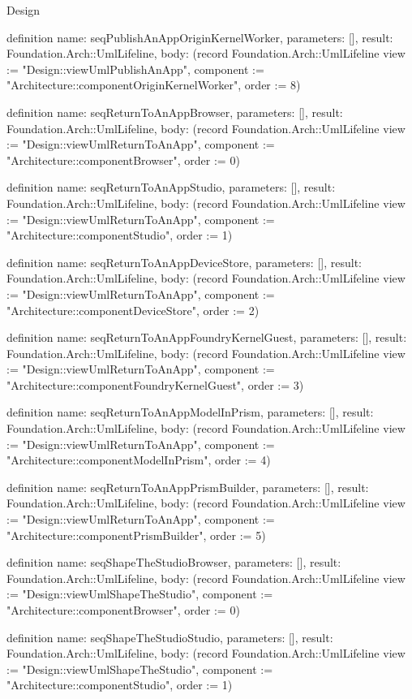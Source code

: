 \begin{lexlean}{Design}
\begin{semanticmodule}
definition{
  name: seqPublishAnAppOriginKernelWorker,
  parameters: [],
  result: Foundation.Arch::UmlLifeline,
  body: (record Foundation.Arch::UmlLifeline {view := "Design::viewUmlPublishAnApp", component := "Architecture::componentOriginKernelWorker", order := 8})
}

definition{
  name: seqReturnToAnAppBrowser,
  parameters: [],
  result: Foundation.Arch::UmlLifeline,
  body: (record Foundation.Arch::UmlLifeline {view := "Design::viewUmlReturnToAnApp", component := "Architecture::componentBrowser", order := 0})
}

definition{
  name: seqReturnToAnAppStudio,
  parameters: [],
  result: Foundation.Arch::UmlLifeline,
  body: (record Foundation.Arch::UmlLifeline {view := "Design::viewUmlReturnToAnApp", component := "Architecture::componentStudio", order := 1})
}

definition{
  name: seqReturnToAnAppDeviceStore,
  parameters: [],
  result: Foundation.Arch::UmlLifeline,
  body: (record Foundation.Arch::UmlLifeline {view := "Design::viewUmlReturnToAnApp", component := "Architecture::componentDeviceStore", order := 2})
}

definition{
  name: seqReturnToAnAppFoundryKernelGuest,
  parameters: [],
  result: Foundation.Arch::UmlLifeline,
  body: (record Foundation.Arch::UmlLifeline {view := "Design::viewUmlReturnToAnApp", component := "Architecture::componentFoundryKernelGuest", order := 3})
}

definition{
  name: seqReturnToAnAppModelInPrism,
  parameters: [],
  result: Foundation.Arch::UmlLifeline,
  body: (record Foundation.Arch::UmlLifeline {view := "Design::viewUmlReturnToAnApp", component := "Architecture::componentModelInPrism", order := 4})
}

definition{
  name: seqReturnToAnAppPrismBuilder,
  parameters: [],
  result: Foundation.Arch::UmlLifeline,
  body: (record Foundation.Arch::UmlLifeline {view := "Design::viewUmlReturnToAnApp", component := "Architecture::componentPrismBuilder", order := 5})
}

definition{
  name: seqShapeTheStudioBrowser,
  parameters: [],
  result: Foundation.Arch::UmlLifeline,
  body: (record Foundation.Arch::UmlLifeline {view := "Design::viewUmlShapeTheStudio", component := "Architecture::componentBrowser", order := 0})
}

definition{
  name: seqShapeTheStudioStudio,
  parameters: [],
  result: Foundation.Arch::UmlLifeline,
  body: (record Foundation.Arch::UmlLifeline {view := "Design::viewUmlShapeTheStudio", component := "Architecture::componentStudio", order := 1})
}


\end{semanticmodule}
\end{lexlean}
